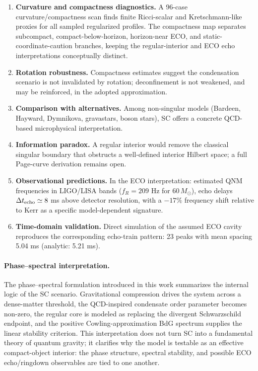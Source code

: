 \documentclass[epj]{svjour}
\begin{document}
\begin{enumerate}
\item \textbf{Curvature and compactness diagnostics.} A 96-case curvature/compactness scan finds finite Ricci-scalar and Kretschmann-like proxies for all sampled regularized profiles. The compactness map separates subcompact, compact-below-horizon, horizon-near ECO, and static-coordinate-caution branches, keeping the regular-interior and ECO echo interpretations conceptually distinct.

\item \textbf{Rotation robustness.} Compactness estimates suggest the condensation scenario is not invalidated by rotation; deconfinement is not weakened, and may be reinforced, in the adopted approximation.

\item \textbf{Comparison with alternatives.} Among non-singular models (Bardeen, Hayward, Dymnikova, gravastars, boson stars), SC offers a concrete QCD-based microphysical interpretation.

\item \textbf{Information paradox.} A regular interior would remove the classical singular boundary that obstructs a well-defined interior Hilbert space; a full Page-curve derivation remains open.

\item \textbf{Observational predictions.} In the ECO interpretation: estimated QNM frequencies in LIGO/LISA bands ($f_R = 209$ Hz for $60\,M_\odot$), echo delays $\Delta t_{\rm echo} \simeq 8$ ms above detector resolution, with a $-17\%$ frequency shift relative to Kerr as a specific model-dependent signature.

\item \textbf{Time-domain validation.} Direct simulation of the assumed ECO cavity reproduces the corresponding echo-train pattern: 23 peaks with mean spacing 5.04 ms (analytic: 5.21 ms).
\end{enumerate}

\paragraph{Phase--spectral interpretation.}
The phase--spectral formulation introduced in this work summarizes the internal
logic of the SC scenario. Gravitational compression drives the system across a
dense-matter threshold, the QCD-inspired condensate order parameter becomes
non-zero, the regular core is modeled as replacing the divergent Schwarzschild endpoint, and
the positive Cowling-approximation BdG spectrum supplies the linear stability criterion. This
interpretation does not turn SC into a fundamental theory of quantum gravity;
it clarifies why the model is testable as an effective compact-object interior:
the phase structure, spectral stability, and possible ECO echo/ringdown observables are tied
to one another.
\end{document}
